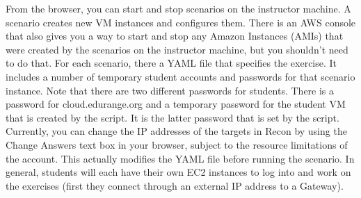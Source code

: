 \documentclass[11pt]{report}
\newcommand{\eat}[1]{}
\begin{document}
From the browser, you can  start and stop scenarios on the instructor machine.
A scenario creates new VM instances and configures them.
There is an AWS console that also gives you a way
to start and stop any Amazon Instances (AMIs) that
were created by the scenarios on the instructor machine, but you shouldn't need to do that.
For each scenario, there a YAML file that specifies the exercise.
It includes a number of temporary student accounts and passwords for that scenario instance. 
Note that there are two different passwords for students.  There is a password 
for cloud.edurange.org and a temporary password for the student VM that is created by
the script.  It is the latter password that is set by the script.
Currently, you can change the IP addresses of the targets in Recon
by using the Change Answers text box in your browser, subject to the resource limitations 
of the account.  
This actually modifies the YAML file before running the scenario.
  In general, students will each have their 
own EC2 instances to log into and work on the exercises (first they connect through 
an external IP address to a Gateway). 
\eat{
The next section will lead you through 
starting an instructor machine and how to use it to create the scenarios.
There are two modes for using EDURange.  You may be using your own account or you may
be using the EDURange group account.  The use of those two modes will described separately.}
\end{document}
